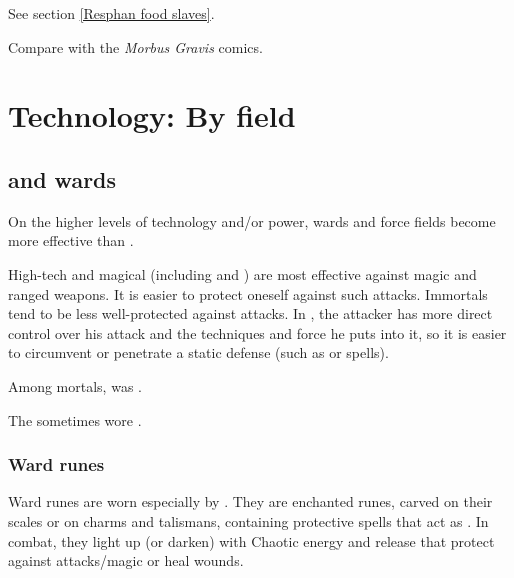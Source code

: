 See section \ref{Resphan food slaves}. 

Compare with the \emph{Morbus Gravis} comics.















\section{Technology: By field}









\subsection{\Armour and wards}
On the higher levels of technology and/or power, wards and force fields become more effective than \armour. 

High-tech and magical \armour (including  and ) are most effective against magic and ranged weapons. 
It is easier to protect oneself against such attacks. 
Immortals tend to be less well-protected against \melee{} attacks.
In \melee, the attacker has more direct control over his attack and the techniques and force he puts into it, so it is easier to circumvent or penetrate a static defense (such as \armour or spells). 

Among mortals, \armour was . 

The \resphain sometimes wore . 





\subsubsection{Ward runes}
Ward runes are worn especially by \dragons. 
They are enchanted runes, carved on their scales or on charms and talismans, containing protective spells that act as \armour. 
In combat, they light up (or darken) with Chaotic energy and release  that protect against attacks/magic or heal wounds. 

